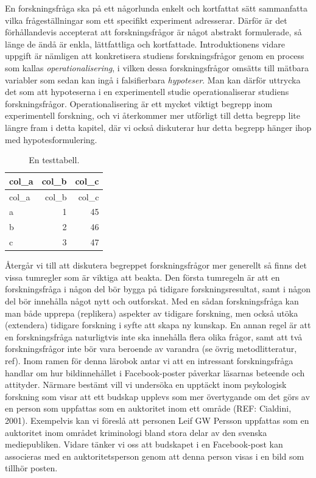 \documentclass[
]{book}
\begin{document}
En forskningsfråga ska på ett någorlunda enkelt och kortfattat sätt sammanfatta vilka frågeställningar som ett specifikt experiment adresserar. Därför är det förhållandevis accepterat att forskningsfrågor är något abstrakt formulerade, så länge de ändå är enkla, lättfattliga och kortfattade. Introduktionens vidare uppgift är nämligen att konkretisera studiens forskningsfrågor genom en process som kallas \emph{operationalisering}, i vilken dessa forskningsfrågor omsätts till mätbara variabler som sedan kan ingå i falsifierbara \emph{hypoteser}. Man kan därför uttrycka det som att hypoteserna i en experimentell studie operationaliserar studiens forskningsfrågor. Operationalisering är ett mycket viktigt begrepp inom experimentell forskning, och vi återkommer mer utförligt till detta begrepp lite längre fram i detta kapitel, där vi också diskuterar hur detta begrepp hänger ihop med hypotesformulering.

\begin{longtable}[]{@{}lrr@{}}
\caption{\label{tab:tab-02-06-1-0-01}En testtabell.}\tabularnewline
\toprule
col\_a & col\_b & col\_c\tabularnewline
\midrule
\endfirsthead
\toprule
col\_a & col\_b & col\_c\tabularnewline
\midrule
\endhead
a & 1 & 45\tabularnewline
b & 2 & 46\tabularnewline
c & 3 & 47\tabularnewline
\bottomrule
\end{longtable}

Återgår vi till att diskutera begreppet forskningsfrågor mer generellt så finns det vissa tumregler som är viktiga att beakta. Den första tumregeln är att en forskningsfråga i någon del bör bygga på tidigare forskningsresultat, samt i någon del bör innehålla något nytt och outforskat. Med en sådan forskningsfråga kan man både upprepa (replikera) aspekter av tidigare forskning, men också utöka (extendera) tidigare forskning i syfte att skapa ny kunskap. En annan regel är att en forskningsfråga naturligtvis inte ska innehålla flera olika frågor, samt att två forskningsfrågor inte bör vara beroende av varandra (se övrig metodlitteratur, ref). Inom ramen för denna lärobok antar vi att en intressant forskningsfråga handlar om hur bildinnehållet i Facebook-poster påverkar läsarnas beteende och attityder. Närmare bestämt vill vi undersöka en upptäckt inom psykologisk forskning som visar att ett budskap upplevs som mer övertygande om det görs av en person som uppfattas som en auktoritet inom ett område (REF: Cialdini, 2001). Exempelvis kan vi föreslå att personen Leif GW Persson uppfattas som en auktoritet inom området kriminologi bland stora delar av den svenska mediepubliken. Vidare tänker vi oss att budskapet i en Facebook-post kan associeras med en auktoritetsperson genom att denna person visas i en bild som tillhör posten.
\end{document}
